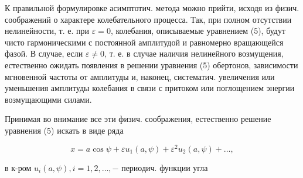 \documentclass[10pt]{article}
\begin{document}
К правильной формулировке асимптотич. метода можно прийти, исходя из физич. соображений о характере колебательного процесса. Так, при полном отсутствии нелинейности, т. е. при $\varepsilon=0$, колебания, описываемые уравнением (5), будут чисто гармоническими с постоянной амплитудой и равномерно вращающейся фазой. В случае, если $\varepsilon \neq 0$, т. е. в случае наличия нелинейного возмущения, естественно ожидать появления в решении уравнения (5) обертонов, зависимости мгновенной частоты от амплитуды и, наконец, систематич. увеличения или уменьшения амплитуды колебания в связи с притоком или поглощением энергии возмущающими силами.



Принимая во внимание все эти физич. соображения, естественно решение уравнения (5) искать в виде ряда



\[

x=a \cos \psi+\varepsilon u_{1}(a, \psi)+\varepsilon^{2} u_{2}(a, \psi)+\ldots,

\]



в к-ром $u_{i}(a, \psi), i=1,2, \ldots,-$ периодич. функции угла
\end{document}
